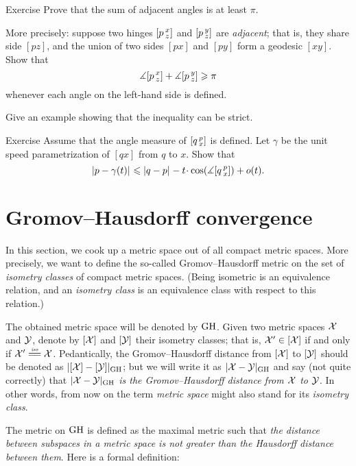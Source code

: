 \begin{thm}{Exercise}\label{ex:adjacent-angles}
Prove that the sum of adjacent angles is at least $\pi$.

More precisely: suppose two hinges $[p\,{}^{x}_{z}]$ and $[p\,{}^{y}_{z}]$ are \emph{adjacent};
that is, they share side $[pz]$, and the union of two sides $[px]$ and $[py]$ form a geodesic $[xy]$.
Show that
\[\measuredangle[p\,{}^{x}_{z}]+\measuredangle[p\,{}^{y}_{z}]\geqslant \pi\]
whenever  each angle on the left-hand side is defined.

Give an example showing that the inequality can be strict.
\end{thm}

\begin{thm}{Exercise}\label{ex:first-var}
Assume that the angle measure of $[q\,{}^{p}_{x}]$ is defined.
Let $\gamma$ be the unit speed parametrization of $[qx]$ from $q$ to $x$.
Show that
\[\dist{p}{\gamma(t)}{}
\le
\dist{q}{p}{}-t\cdot \cos(\mangle\hinge q p x)+o(t).\]

\end{thm}

\section{Gromov--Hausdorff convergence}

In this section, we cook up a metric space out of all compact metric spaces.
More precisely, we want to define the so-called  Gromov--Hausdorff metric on the set of \textit{isometry classes} of compact metric spaces.
(Being isometric is an equivalence relation, 
and an \emph{isometry class} is an equivalence class with respect to this relation.)

The obtained metric space will be denoted by $\operatorname{\rm GH}\nolimits$.
Given two metric spaces $\mathcal{X}$ and $\mathcal{Y}$,
denote by $[\mathcal{X}]$ and $[\mathcal{Y}]$ their isometry classes;
that is, $\mathcal{X}'\in [\mathcal{X}]$ if and only if $\spc{X}'\iso \spc{X}$.
Pedantically, the Gromov--Hausdorff distance from $[\mathcal{X}]$ 
to $[\mathcal{Y}]$ should be denoted as $|[\mathcal{X}]-[\mathcal{Y}]|_{\operatorname{\rm GH}\nolimits}$;
but we will write it as $|\spc{X}\z-\spc{Y}|_{\GH}$ and say (not quite correctly) that 
\textit{$|\spc{X}\z-\spc{Y}|_{\GH}$ is the Gromov--Hausdorff distance from  $\mathcal{X}$ 
to  $\mathcal{Y}$}.
In other words, from now on the term \textit{metric space} might also stand for its \textit{isometry class}.

The metric on $\operatorname{\rm GH}\nolimits$ is defined as the maximal metric such that \textit{the distance between subspaces in a metric space is not greater than the Hausdorff distance between them}.
Here is a formal definition:

